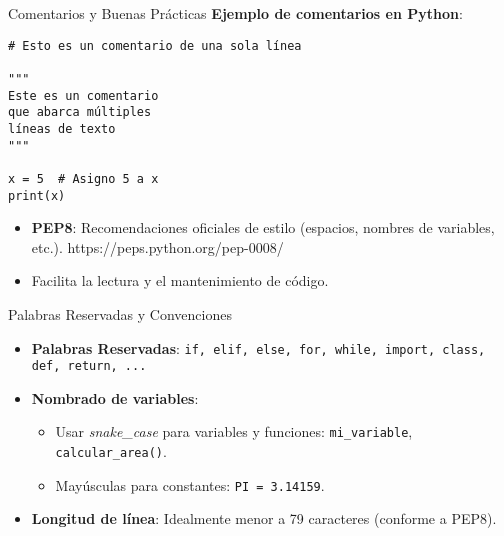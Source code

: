 \documentclass[10pt]{beamer}
\begin{document}
\begin{frame}[fragile]{Comentarios y Buenas Prácticas}
  \textbf{Ejemplo de comentarios en Python}:
  \begin{verbatim}
# Esto es un comentario de una sola línea

"""
Este es un comentario
que abarca múltiples
líneas de texto
"""

x = 5  # Asigno 5 a x
print(x)
  \end{verbatim}
  \begin{itemize}
    \item \textbf{PEP8}: Recomendaciones oficiales de estilo (espacios, nombres de variables, etc.). https://peps.python.org/pep-0008/
    \item Facilita la lectura y el mantenimiento de código.
  \end{itemize}
\end{frame}

\begin{frame}{Palabras Reservadas y Convenciones}
  \begin{itemize}
    \item \textbf{Palabras Reservadas}: \texttt{if, elif, else, for, while, import, class, def, return, ...}
    \item \textbf{Nombrado de variables}:
      \begin{itemize}
        \item Usar \emph{snake\_case} para variables y funciones: \texttt{mi\_variable}, \texttt{calcular\_area()}.
        \item Mayúsculas para constantes: \texttt{PI = 3.14159}.
      \end{itemize}
    \item \textbf{Longitud de línea}: Idealmente menor a 79 caracteres (conforme a PEP8).
  \end{itemize}
\end{frame}

\end{document}
